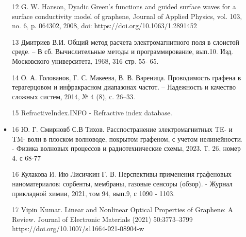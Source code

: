 \begin{itemize}
		\item [12] G. W. Hanson, Dyadic Green’s functions and guided surface
		waves for a surface conductivity model of graphene, Journal of
		Applied Physics, vol. 103, no. 6, p. 064302, 2008, doi:
		https://doi.org/10.1063/1.2891452
		
		\item [13] Дмитриев В.И. Общий метод расчета электромагнитного поля
		в слоистой среде. – В сб. Вычислительные методы и
		программирование, вып.10. Изд. Московского университета,
		1968, 316 стр. 55- 65.
		
		\item [14] О. А. Голованов, Г. С. Макеева, В. В. Вареница. Проводимость
		графена в терагерцовом и инфракрасном диапазонах частот. –
		Надежность и качество сложных систем, 2014, № 4 (8), с.
		26–33.
		
		\item  [15] RefractiveIndex.INFO - Refractive index database.
		\item 16 Ю. Г. Смирновб С.В Тихов. Расспостранение электромагнитных TE- и TM- волн в плоском волноводе, покрытом графеном, с учетом нелинейности. - Физика волновых процессов и радиотехнические схемы, 2023. Т. 26, номер 4. с 
		68-77
		
		
		
		\item [16] Кулакова И. Ию Лисичкин Г. В. Перспективы применения графеновых наноматериалов: 
		сорбенты, мембраны, газовые сенсоры (обзор). - Журнал прикладной химии, 2021, том 94, вып.9, с 1090 - 1103.
		
		
		
		\item [17] Vipin Kumar. Linear and Nonlinear Optical Properties of Graphene:
		A Review. Journal of Electronic Materials (2021) 50:3773–3799 \newline
		https://doi.org/10.1007/s11664-021-08904-w 
	\end{itemize}
	
	
	
